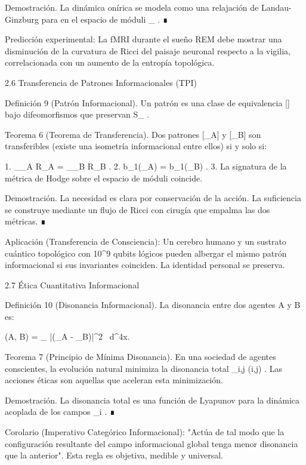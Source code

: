 \documentclass[12pt,a4paper]{book}
\begin{document}
Demostración. La dinámica onírica se modela como una relajación de Landau-Ginzburg para  \rho  en el espacio de móduli  _{} . ∎

Predicción experimental: La fMRI durante el sueño REM debe mostrar una disminución de la curvatura de Ricci del paisaje neuronal respecto a la vigilia, correlacionada con un aumento de la entropía topológica.

2.6 Transferencia de Patrones Informacionales (TPI)

Definición 9 (Patrón Informacional). Un patrón es una clase de equivalencia  [\rho]  bajo difeomorfismos que preservan  S_{} .

Teorema 6 (Teorema de Transferencia). Dos patrones  [\rho_A]  y  [\rho_B]  son transferibles (existe una isometría informacional entre ellos) si y solo si:

1.  \int_{_A} R_A  = \int_{_B} R_B  .
2.  b_1(_A) = b_1(_B) .
3. La signatura de la métrica de Hodge sobre el espacio de móduli coincide.

Demostración. La necesidad es clara por conservación de la acción. La suficiencia se construye mediante un flujo de Ricci con cirugía que empalma las dos métricas. ∎

Aplicación (Transferencia de Consciencia): Un cerebro humano y un sustrato cuántico topológico con  10^{9}  qubits lógicos pueden albergar el mismo patrón informacional si sus invariantes coinciden. La identidad personal se preserva.

2.7 Ética Cuantitativa Informacional

Definición 10 (Disonancia Informacional). La disonancia entre dos agentes  A  y  B  es:

\Delta(A, B) = \int_{} |\nabla (\rho_A - \rho_B)|^2  \, d^4x.
\]  

Teorema 7 (Principio de Mínima Disonancia). En una sociedad de agentes conscientes, la evolución natural minimiza la disonancia total  \sum_{i,j} \Delta(i,j) . Las acciones éticas son aquellas que aceleran esta minimización.

Demostración. La disonancia total es una función de Lyapunov para la dinámica acoplada de los campos  \rho_i . ∎

Corolario (Imperativo Categórico Informacional): "Actúa de tal modo que la configuración resultante del campo informacional global tenga menor disonancia que la anterior". Esta regla es objetiva, medible y universal.
\end{document}
